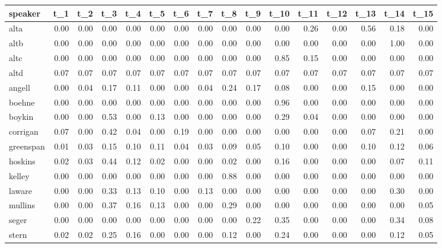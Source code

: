\begin{tabular}{lrrrrrrrrrrrrrrr}
\toprule
   speaker &  t\_1 &  t\_2 &  t\_3 &  t\_4 &  t\_5 &  t\_6 &  t\_7 &  t\_8 &  t\_9 &  t\_10 &  t\_11 &  t\_12 &  t\_13 &  t\_14 &  t\_15 \\
\midrule
      alta & 0.00 & 0.00 & 0.00 & 0.00 & 0.00 & 0.00 & 0.00 & 0.00 & 0.00 &  0.00 &  0.26 &  0.00 &  0.56 &  0.18 &  0.00 \\
      altb & 0.00 & 0.00 & 0.00 & 0.00 & 0.00 & 0.00 & 0.00 & 0.00 & 0.00 &  0.00 &  0.00 &  0.00 &  0.00 &  1.00 &  0.00 \\
      altc & 0.00 & 0.00 & 0.00 & 0.00 & 0.00 & 0.00 & 0.00 & 0.00 & 0.00 &  0.85 &  0.15 &  0.00 &  0.00 &  0.00 &  0.00 \\
      altd & 0.07 & 0.07 & 0.07 & 0.07 & 0.07 & 0.07 & 0.07 & 0.07 & 0.07 &  0.07 &  0.07 &  0.07 &  0.07 &  0.07 &  0.07 \\
    angell & 0.00 & 0.04 & 0.17 & 0.11 & 0.00 & 0.00 & 0.04 & 0.24 & 0.17 &  0.08 &  0.00 &  0.00 &  0.15 &  0.00 &  0.00 \\
    boehne & 0.00 & 0.00 & 0.00 & 0.00 & 0.00 & 0.00 & 0.00 & 0.00 & 0.00 &  0.96 &  0.00 &  0.00 &  0.00 &  0.00 &  0.00 \\
    boykin & 0.00 & 0.00 & 0.53 & 0.00 & 0.13 & 0.00 & 0.00 & 0.00 & 0.00 &  0.29 &  0.04 &  0.00 &  0.00 &  0.00 &  0.00 \\
  corrigan & 0.07 & 0.00 & 0.42 & 0.04 & 0.00 & 0.19 & 0.00 & 0.00 & 0.00 &  0.00 &  0.00 &  0.00 &  0.07 &  0.21 &  0.00 \\
 greenspan & 0.01 & 0.03 & 0.15 & 0.10 & 0.11 & 0.04 & 0.03 & 0.09 & 0.05 &  0.10 &  0.00 &  0.00 &  0.10 &  0.12 &  0.06 \\
   hoskins & 0.02 & 0.03 & 0.44 & 0.12 & 0.02 & 0.00 & 0.00 & 0.02 & 0.00 &  0.16 &  0.00 &  0.00 &  0.00 &  0.07 &  0.11 \\
    kelley & 0.00 & 0.00 & 0.00 & 0.00 & 0.00 & 0.00 & 0.00 & 0.88 & 0.00 &  0.00 &  0.00 &  0.00 &  0.00 &  0.00 &  0.00 \\
    laware & 0.00 & 0.00 & 0.33 & 0.13 & 0.10 & 0.00 & 0.13 & 0.00 & 0.00 &  0.00 &  0.00 &  0.00 &  0.00 &  0.30 &  0.00 \\
   mullins & 0.00 & 0.00 & 0.37 & 0.16 & 0.13 & 0.00 & 0.00 & 0.29 & 0.00 &  0.00 &  0.00 &  0.00 &  0.00 &  0.00 &  0.05 \\
     seger & 0.00 & 0.00 & 0.00 & 0.00 & 0.00 & 0.00 & 0.00 & 0.00 & 0.22 &  0.35 &  0.00 &  0.00 &  0.00 &  0.34 &  0.08 \\
     stern & 0.02 & 0.02 & 0.25 & 0.16 & 0.00 & 0.00 & 0.00 & 0.12 & 0.00 &  0.24 &  0.00 &  0.00 &  0.00 &  0.12 &  0.05 \\
\bottomrule
\end{tabular}
